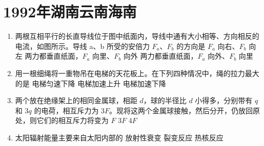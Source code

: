 \documentclass[\gkver]{gaokaozhenti}
\begin{document}
\chapter{1992年湖南云南海南}

\begin{enumerate}
\item
两根互相平行的长直导线位于图中纸面内，导线中通有大小相等、方向相反的电流，如图所示。导线 a、b 所受的安倍力 $F_{a}$、$F_{b}$ 的方向是
{$F_{a}$ 向右、$F_{b}$ 向左}
{两力都垂直纸面，$F_{a}$ 向里、$F_{b}$ 向外}
{两力都垂直纸面，$F_{a}$ 向外、$F_{b}$ 向里}

\item
用一根细绳将一重物吊在电梯的天花板上。在下列四种情况中，绳的拉力最大的是
{电梯匀速下降}
{电梯加速上升}
{电梯加速下降}

\item
两个放在绝缘架上的相同金属球，相距 $d$，球的半径比 $d$ 小得多，分别带有 $q$ 和 $3q$ 的电荷，相互斥力为 $3F$。现将这两个金属球接触，然后分开，仍放回原处，则它们的相互斥力将变为
{$F$}
{$3F$}
{$4F$}

\item
太阳辐射能量主要来自太阳内部的
{放射性衰变}
{裂变反应}
{热核反应}


\end{enumerate}
\end{document}
